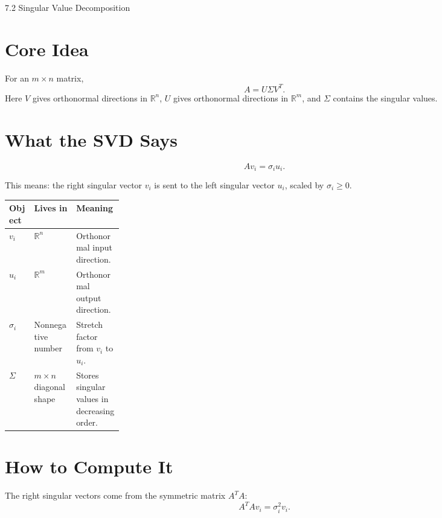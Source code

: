 \documentclass[10pt]{article}
\begin{document}
\begin{center}
{\LARGE 7.2 Singular Value Decomposition\par}
\end{center}

\section{Core Idea}


For an \(m\times n\) matrix,
\[
A=U\Sigma V^{T}.
\]
Here \(V\) gives orthonormal directions in \(\mathbb{R}^n\), \(U\) gives orthonormal directions in \(\mathbb{R}^m\), and \(\Sigma\) contains the singular values.

\section{What the SVD Says}

\[
Av_i=\sigma_i u_i.
\]

This means: the right singular vector \(v_i\) is sent to the left singular vector \(u_i\), scaled by \(\sigma_i\ge 0\).

\begin{center}
\small
\begin{tabularx}{\linewidth}{@{}L{0.22\linewidth}Y Y@{}}
\toprule
Object & Lives in & Meaning \\
\midrule
\(v_i\) & \(\mathbb{R}^n\) & Orthonormal input direction. \\
\(u_i\) & \(\mathbb{R}^m\) & Orthonormal output direction. \\
\(\sigma_i\) & Nonnegative number & Stretch factor from \(v_i\) to \(u_i\). \\
\(\Sigma\) & \(m\times n\) diagonal shape & Stores singular values in decreasing order. \\
\bottomrule
\end{tabularx}
\end{center}

\section{How to Compute It}

The right singular vectors come from the symmetric matrix \(A^{T}A\):
\[
A^{T}A v_i=\sigma_i^2 v_i.
\]
\end{document}
